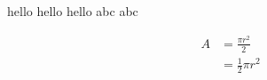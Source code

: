 \documentclass[options]{article}
\begin{document}
hello hello hello 
abc abc

\begin{equation} \label{eq1}
    \begin{split}
    A & = \frac{\pi r^2}{2} \\
     & = \frac{1}{2} \pi r^2
    \end{split}
    \end{equation}
\end{document}

